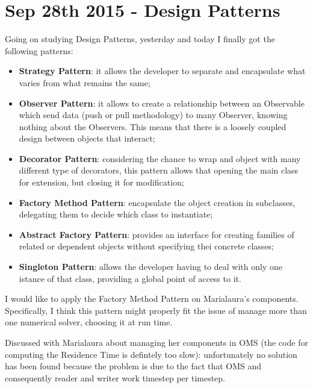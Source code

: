 \section{Sep 28th 2015 - Design Patterns}

Going on studying Design Patterns, yesterday and today I finally got
the following patterns:

\begin{itemize}
\item \textbf{Strategy Pattern}: it allows the developer to separate
  and encapsulate what varies from what remains the same;
\item \textbf{Observer Pattern}: it allows to create a relationship
  between an Observable which send data (push or pull methodology) to
  many Observer, knowing nothing about the Observers. This means that
  there is a loosely coupled design between objects that interact;
\item \textbf{Decorator Pattern}: considering the chance to wrap and
  object with many different type of decorators, this pattern allows
  that opening the main class for extension, but closing it for
  modification;
\item \textbf{Factory Method Pattern}: encapsulate the object creation
  in subclasses, delegating them to decide which class to instantiate;
\item \textbf{Abstract Factory Pattern}: provides an interface for
  creating families of related or dependent objects without specifying
  thei concrete classes;
\item \textbf{Singleton Pattern}: allows the developer having to deal
  with only one istance of that class, providing a global point of
  access to it.
\end{itemize}

I would like to apply the Factory Method Pattern on Marialaura's
components. Specifically, I think this pattern might properly fit the
issue of manage more than one numerical solver, choosing it at run
time.

\par\medskip

Discussed with Marialaura about managing her components in OMS (the
code for computing the Residence Time is defintely too slow):
unfortunately no solution has been found because the problem is due to
the fact that OMS and consequently reader and writer work timestep per
timestep.
